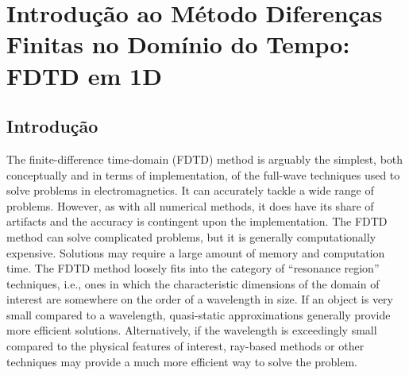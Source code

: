\chapter[Introdução ao Método FDTD]{Introdução ao 
Método Diferenças Finitas no Domínio do Tempo: FDTD em 1D
\label{chap:fdtdIntro}} 


\renewcommand{\thefootnote}{\fnsymbol{footnote}}

\section{Introdução}

The finite-difference time-domain (FDTD) method is arguably the
simplest, both conceptually and in terms of implementation, of the
full-wave techniques used to solve problems in electromagnetics.  It
can accurately tackle a wide range of problems.  However, as with all
numerical methods, it does have its share of artifacts and the
accuracy is contingent upon the implementation.  The FDTD method can
solve complicated problems, but it is generally computationally
expensive.  Solutions may require a large amount of memory and
computation time.  The FDTD method loosely fits into the category of
``resonance region'' techniques, i.e., ones in which the
characteristic dimensions of the domain of interest are somewhere on
the order of a wavelength in size.  If an object is very small
compared to a wavelength, quasi-static approximations generally
provide more efficient solutions.  Alternatively, if the wavelength is
exceedingly small compared to the physical features of interest,
ray-based methods or other techniques may provide a much more
efficient way to solve the problem.

